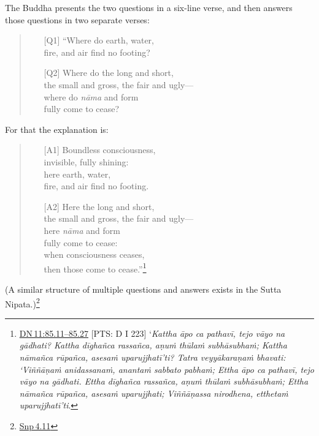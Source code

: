 \documentclass[10pt, openany]{book}
\begin{document}
The Buddha presents the two questions in a six-line verse, and then answers those questions in two separate verses:


\begin{quote}


\begin{itemize}

\item[{[Q1]}]“Where do earth, water, \\ fire, and air find no footing?


\item[{[Q2]}]Where do the long and short, \\ the small and gross, the fair and ugly— \\ where do \textit{nāma} and form \\ fully come to cease?

\end{itemize}

\end{quote}
For that the explanation is:


\begin{quote}


\begin{itemize}

\item[{[A1]}]Boundless consciousness, \\ invisible, fully shining: \\ here earth, water, \\ fire, and air find no footing.


\item[{[A2]}]Here the long and short, \\ the small and gross, the fair and ugly— \\ here \textit{nāma} and form \\ fully come to cease: \\ when consciousness ceases, \\ then those come to cease.”\footnote {\href{https://suttacentral.net/dn11/en/sujato\#85.11}{DN 11:85.11–85.27} [PTS: D I 223] ‘\textit{Kattha āpo ca pathavī, tejo vāyo na gādhati? Kattha dīghañca rassañca, aṇuṁ thūlaṁ subhāsubhaṁ; Kattha nāmañca rūpañca, asesaṁ uparujjhatī’ti? Tatra veyyākaraṇaṁ bhavati: ‘Viññāṇaṁ anidassanaṁ, anantaṁ sabbato pabhaṁ; Ettha āpo ca pathavī, tejo vāyo na gādhati. Ettha dīghañca rassañca, aṇuṁ thūlaṁ subhāsubhaṁ; Ettha nāmañca rūpañca, asesaṁ uparujjhati; Viññāṇassa nirodhena, etthetaṁ uparujjhatī’ti}.}

\end{itemize}

\end{quote}
(A similar structure of multiple questions and answers exists in the Sutta Nipata.)\footnote {\href{https://suttacentral.net/snp4.11/en/sujato}{Snp 4.11}}
\end{document}
